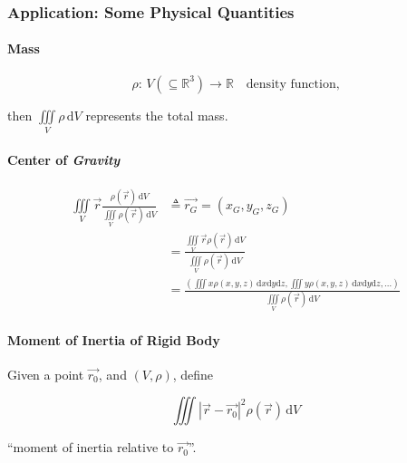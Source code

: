 \subsubsection[来自物理学中的几个例子]{Application: Some Physical Quantities}

\paragraph*{Mass}

$$\rho:\,V\left(\subseteq\mathbb{R}^3\right)\to\mathbb{R}\quad\text{density function,}$$

then $\displaystyle\iiint\limits_V \rho\,\mathrm{d}V$ represents the total mass.

\paragraph*{Center of \emph{Gravity}}

\begin{align*}
    \iiint\limits_V\overrightarrow{r}\boxed{\frac{\rho\left(\overrightarrow{r}\right)\,\mathrm{d}V}{\iiint\limits_V\rho\left(\overrightarrow{r}\right)\,\mathrm{d}V}}
     & \triangleq\overrightarrow{r_G}=\left(x_G,y_G,z_G\right)                                                                                                                                                   \\
     & =\frac{\iiint\limits_V\overrightarrow{r}\rho\left(\overrightarrow{r}\right)\,\mathrm{d}V}{\iiint\limits_V\rho\left(\overrightarrow{r}\right)\,\mathrm{d}V}                                                \\
     & =\frac{\left(\iiint x\rho(x,y,z)\,\mathrm{d}x\mathrm{d}y\mathrm{d}z,\iiint y\rho(x,y,z)\,\mathrm{d}x\mathrm{d}y\mathrm{d}z,\dots\right)}{\iiint\limits_V\rho\left(\overrightarrow{r}\right)\,\mathrm{d}V}
\end{align*}

\paragraph*{Moment of Inertia of Rigid Body}

Given a point $\overrightarrow{r_0}$, and $(V,\rho)$, define

$$\iiint\left|\overrightarrow{r}-\overrightarrow{r_0}\right|^2\rho\left(\overrightarrow{r}\right)\,\mathrm{d}V$$

``moment of inertia relative to $\overrightarrow{r_0}$''.

